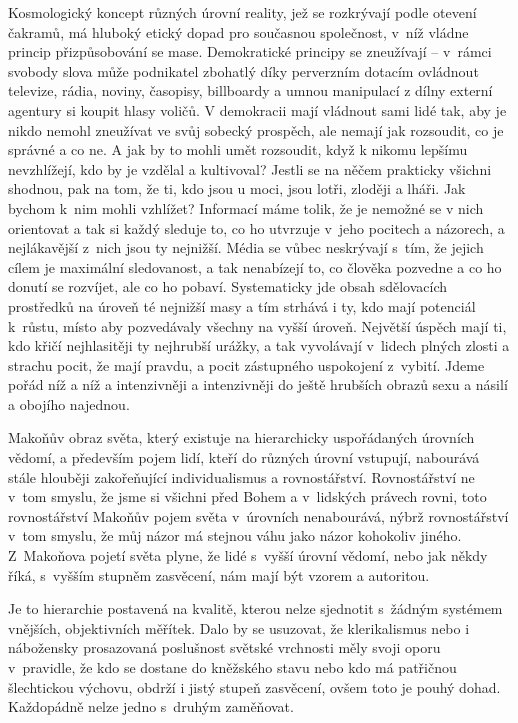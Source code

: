 Kosmologický koncept různých úrovní reality, jež se rozkrývají podle otevení
čakramů, má hluboký etický dopad pro současnou společnost, v~níž vládne princip
přizpůsobování se mase. Demokratické principy se zneužívají -- v~rámci svobody
slova může podnikatel zbohatlý díky perverzním dotacím ovládnout televize,
rádia, noviny, časopisy, billboardy a umnou manipulací z dílny externí agentury
si koupit hlasy voličů. V demokracii mají vládnout sami lidé tak, aby je nikdo
nemohl zneužívat ve svůj sobecký prospěch, ale nemají jak rozsoudit, co je
správné a co ne. A jak by to mohli umět rozsoudit, když k nikomu lepšímu
nevzhlížejí, kdo by je vzdělal a kultivoval? Jestli se na něčem prakticky
všichni shodnou, pak na tom, že ti, kdo jsou u moci, jsou lotři, zloději a
lháři. Jak bychom k~nim mohli vzhlížet? Informací máme tolik, že je nemožné se v
nich orientovat a tak si každý sleduje to, co ho utvrzuje v~jeho pocitech a
názorech, a nejlákavější z~nich jsou ty nejnižší. Média se vůbec neskrývají
s~tím, že jejich cílem je maximální sledovanost, a tak nenabízejí to, co člověka
pozvedne a co ho donutí se rozvíjet, ale co ho pobaví. Systematicky jde obsah
sdělovacích prostředků na úroveň té nejnižší masy a tím strhává i ty, kdo mají
potenciál k~růstu, místo aby pozvedávaly všechny na vyšší úroveň. Největší
úspěch mají ti, kdo křičí nejhlasitěji ty nejhrubší urážky, a tak vyvolávají
v~lidech plných zlosti a strachu pocit, že mají pravdu, a pocit zástupného
uspokojení z~vybití. Jdeme pořád níž a níž a intenzivněji a intenzivněji do
ještě hrubších obrazů sexu a násilí a obojího najednou.

Makoňův obraz světa, který existuje na hierarchicky uspořádaných úrovních
vědomí, a především pojem lidí, kteří do různých úrovní vstupují, nabourává
stále hlouběji zakořeňující individualismus a rovnostářství. Rovnostářství ne
v~tom smyslu, že jsme si všichni před Bohem a v~lidských právech rovni, toto
rovnostářství Makoňův pojem světa v~úrovních nenabourává, nýbrž rovnostářství
v~tom smyslu, že můj názor má stejnou váhu jako názor kohokoliv jiného.
Z~Makoňova pojetí světa plyne, že lidé s~vyšší úrovní vědomí, nebo jak někdy
říká, s~vyšším stupněm zasvěcení, nám mají být vzorem a autoritou.

Je to hierarchie postavená na kvalitě, kterou nelze sjednotit s~žádným systémem
vnějších, objektivních měřítek. Dalo by se usuzovat, že klerikalismus nebo i
nábožensky prosazovaná poslušnost světské vrchnosti měly svoji oporu v~pravidle,
že kdo se dostane do kněžského stavu nebo kdo má patřičnou šlechtickou výchovu,
obdrží i jistý stupeň zasvěcení, ovšem toto je pouhý dohad. Každopádně nelze
jedno s~druhým zaměňovat.

